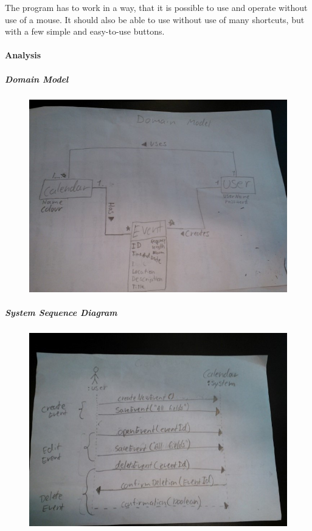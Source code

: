 \documentclass{article}
\begin{document}
  The program has to work in a way, that it is possible to use and operate without use of a mouse. It should also be able to use without use of many shortcuts, but with a few simple and easy-to-use buttons. 
  
  	\paragraph{Analysis} \mbox{}
  	
	
	\newpage
	\subparagraph{Domain Model} \mbox{}
	
	\begin{figure}[h]
	\caption{}
	\hspace{-50pt}   
   	\includegraphics[scale=.65]{LatexFiles/Analyze/DomainModel/DomainModel}
   	\end{figure}
	
\newpage
	\subparagraph{System Sequence Diagram} \mbox{}

	\begin{figure}[h]
	\caption{}   
   	\hspace{-50pt}
   	\includegraphics[scale=.65]{LatexFiles/Analyze/SystemSequenceDiagram/SSD}
   	\end{figure}
\end{document}
